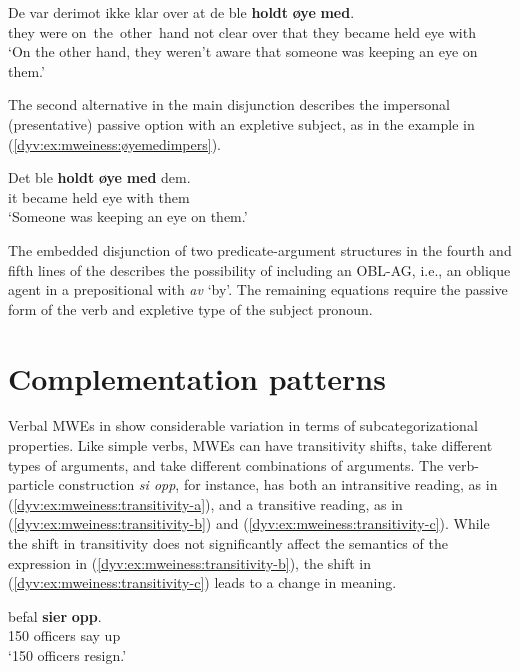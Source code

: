\documentclass[output=paper]{langsci/langscibook}
\begin{document}
\ea\label{dyv:ex:mweiness:øyemedpass}
\gll De var derimot ikke klar over at de ble \textbf{holdt} \textbf{øye} \textbf{med}. \\
     they were on the other hand not clear over that they became held eye with\\
\glt `On the other hand, they weren't aware that someone was keeping an eye on them.'
\z

The second alternative in the main disjunction describes the impersonal (presentative) passive option with an expletive subject, as in the example in (\ref{dyv:ex:mweiness:øyemedimpers}).

\ea\label{dyv:ex:mweiness:øyemedimpers}
\gll Det ble \textbf{holdt} \textbf{øye} \textbf{med} dem. \\
     it became held eye with them\\
\glt `Someone was keeping an eye on them.'
\z

The embedded disjunction of two predicate-argument structures in the fourth and fifth lines of the  describes the possibility of including an OBL-AG, i.e., an oblique agent in a prepositional  with \textit{av} `by'.
The remaining equations require the passive form of the verb and expletive type of the subject pronoun.

\section{Complementation patterns}\label{dyv:sec:mweiness:complementation}

Verbal MWEs in  show considerable variation in terms of subcategorizational properties. 
Like simple verbs, MWEs can have transitivity shifts, take different types of arguments, and take different combinations of arguments. 
The verb-particle construction \emph{si opp}, for instance, has both an intransitive reading, as in (\ref{dyv:ex:mweiness:transitivity-a}), and a transitive reading, as in (\ref{dyv:ex:mweiness:transitivity-b}) and (\ref{dyv:ex:mweiness:transitivity-c}).
While the shift in transitivity does not significantly affect the semantics of the expression in (\ref{dyv:ex:mweiness:transitivity-b}), the shift in (\ref{dyv:ex:mweiness:transitivity-c}) leads to a change in meaning.  

\ea \label{dyv:ex:mweiness:transitivity-a}  befal \textbf{sier} \textbf{opp}. \\ 
     150 officers say up\\
\glt `150 officers resign.' \\ 
\z
\end{document}
